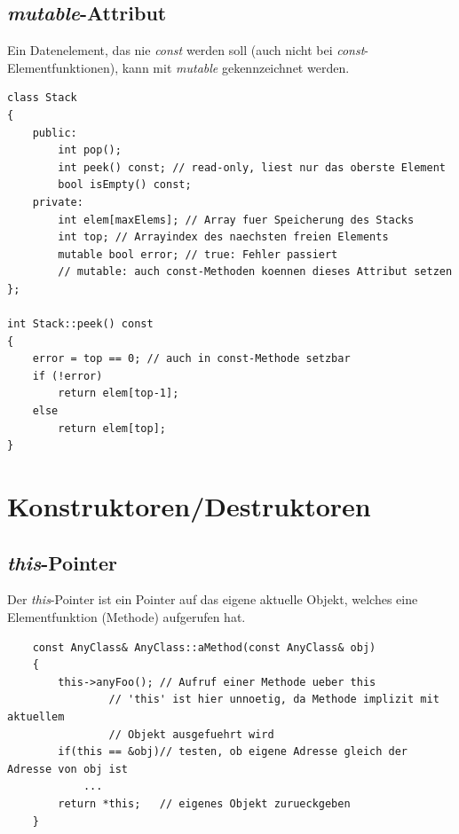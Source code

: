 \subsection{\emph{mutable}-Attribut}
Ein Datenelement, das nie \emph{const} werden soll (auch nicht bei \emph{const}-Elementfunktionen), kann mit \emph{mutable} gekennzeichnet werden.
\vspace{-\baselineskip}
\begin{minipage}{0.85\linewidth}
\begin{lstlisting}
class Stack
{
	public:
		int pop();
		int peek() const; // read-only, liest nur das oberste Element
		bool isEmpty() const;
	private:
		int elem[maxElems]; // Array fuer Speicherung des Stacks
		int top; // Arrayindex des naechsten freien Elements
		mutable bool error; // true: Fehler passiert
		// mutable: auch const-Methoden koennen dieses Attribut setzen
};

int Stack::peek() const
{
	error = top == 0; // auch in const-Methode setzbar
	if (!error)
		return elem[top-1];
	else
		return elem[top];
}
\end{lstlisting}
\end{minipage}

\section{Konstruktoren/Destruktoren}

\subsection{\emph{this}-Pointer}
Der \emph{this}-Pointer ist ein Pointer auf das eigene aktuelle Objekt, welches eine Elementfunktion (Methode) aufgerufen hat.
\vspace{-\baselineskip}
\begin{minipage}{\linewidth}
	\begin{lstlisting}
	const AnyClass& AnyClass::aMethod(const AnyClass& obj)
	{
		this->anyFoo();	// Aufruf einer Methode ueber this
				// 'this' ist hier unnoetig, da Methode implizit mit aktuellem
				// Objekt ausgefuehrt wird
		if(this == &obj)// testen, ob eigene Adresse gleich der Adresse von obj ist
			...
		return *this;	// eigenes Objekt zurueckgeben
	}
	\end{lstlisting}
\end{minipage}

